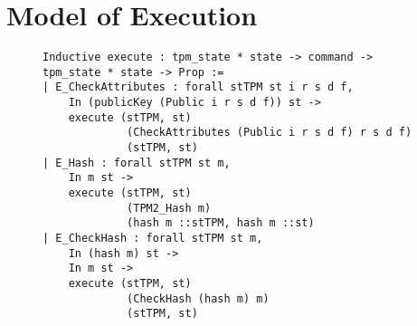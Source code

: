 \chapter{Model of Execution}


\begin{figure}[h]
\begin{lstlisting}[language=Coq]
Inductive execute : tpm_state * state -> command -> tpm_state * state -> Prop :=
| E_CheckAttributes : forall stTPM st i r s d f,
    In (publicKey (Public i r s d f)) st ->
    execute (stTPM, st)
             (CheckAttributes (Public i r s d f) r s d f)
             (stTPM, st)
| E_Hash : forall stTPM st m,
    In m st ->
    execute (stTPM, st)
             (TPM2_Hash m)
             (hash m ::stTPM, hash m ::st)
| E_CheckHash : forall stTPM st m,
    In (hash m) st ->
    In m st ->
    execute (stTPM, st)
             (CheckHash (hash m) m)
             (stTPM, st)
\end{lstlisting}
\end{figure}